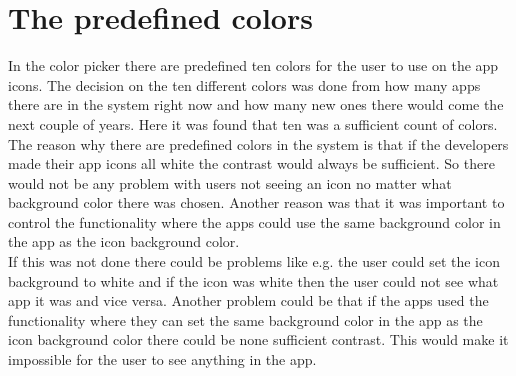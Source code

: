 \section{ The predefined colors} 
In the color picker there are predefined ten colors for the user to use on the app icons. The decision on the ten different colors was done from how many apps there are in the \giraf[] system right now and how many new ones there would come the next couple of years. Here it was found that ten was a sufficient count of colors. \\
The reason why there are predefined colors in the \giraf[] system is that if the developers made their app icons all white the contrast would always be sufficient. So there would not be any problem with users not seeing an icon no matter what background color there was chosen.  Another reason was that it was important to control the functionality where the apps could use the same background color in the app as the icon background color. \\
If this was not done there could be problems like e.g. the user could set the icon background to white and if the icon was white then the user could not see what app it was and vice versa. Another problem could be that if the apps used the functionality where they can set the same background color in the app as the icon background color there could be none sufficient contrast. This would make it impossible for the user to see anything in the app.


